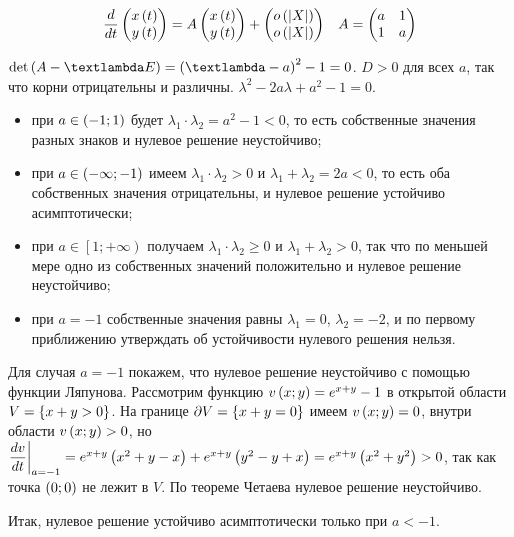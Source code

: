 \documentclass[a5paper,10pt]{article}
\begin{document}
\begin{align*} 
    \dfrac {d} {dt} \begin{pmatrix} x\left(t\right) \\ y\left(t\right) \end{pmatrix} = A \begin{pmatrix} x\left(t\right) \\ y\left(t\right) \end{pmatrix} + \begin{pmatrix} o\left(\left|X\right|\right) \\ o\left(\left|X\right|\right) \end{pmatrix} 
    && A = \begin{pmatrix} a & 1 \\ 1 & a \end{pmatrix}
\end{align*}

$\det\br{A - \lambda E} = \br{\lambda - a}^2 - 1 = 0$.
$D > 0$ для всех $a$, так что корни отрицательны и различны.
$\lambda^2 - 2a \lambda + a^2 - 1 = 0$.
\begin{itemize}
    \item при $a \in \left(-1; 1\right)$ будет $\lambda_{1} \cdot \lambda_{2} = a^2 - 1 < 0$, то есть собственные значения разных знаков и нулевое решение неустойчиво;
    
    \item при $a \in \left(-\infty; -1\right)$ имеем $\lambda_{1} \cdot \lambda_{2} > 0$ и $\lambda_{1} + \lambda_{2} = 2a < 0$, то есть оба собственных значения отрицательны, и нулевое решение устойчиво асимптотически;
    
    \item при $a \in \left[1; +\infty \right)$ получаем $\lambda_{1} \cdot \lambda_{2} \ge 0$ и $\lambda_{1} + \lambda_{2} > 0$, так что по меньшей мере одно из собственных значений положительно и нулевое решение неустойчиво;
    
    \item при $a = -1$ собственные значения равны $\lambda_{1} = 0$, $\lambda_{2} = -2$, и по первому приближению утверждать об устойчивости нулевого решения нельзя.
\end{itemize}

Для случая $a = -1$ покажем, что нулевое решение неустойчиво с помощью функции Ляпунова. Рассмотрим функцию $v\left(x; y\right) = e^{x + y} - 1$ в открытой области $V = \left\{x + y > 0\right\}$. На границе $\partial V = \left\{x + y = 0\right\}$ имеем $v\left(x; y\right) = 0$, внутри области $v\left(x; y\right) > 0$, но $\dfrac {dv} {dt}\bigg|_{a = -1} \linebreak = e^{x + y} \br{x^2 + y - x} + e^{x + y} \br{y^2 - y + x} = e^{x + y} \br{x^2 + y^2} > 0$, так как точка $\left(0; 0\right)$ не лежит в $V$. По теореме Четаева нулевое решение неустойчиво.

Итак, нулевое решение устойчиво асимптотически только при $a < -1$.
\end{document}
